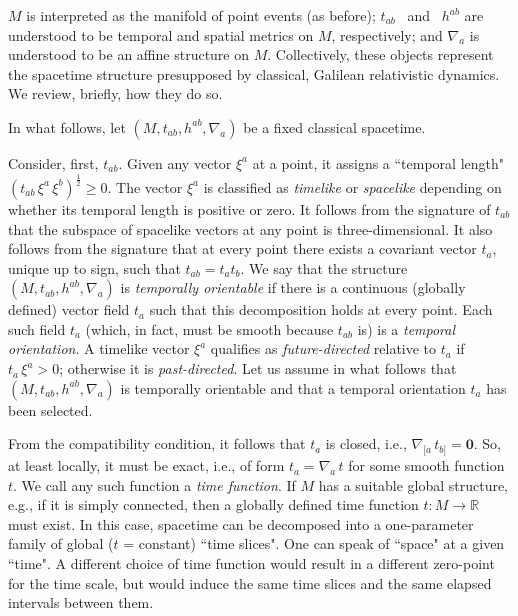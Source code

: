 \documentclass [12] {article}
\theoremstyle{plain}
\numberwithin{figure}{subsection}
\numberwithin{proposition}{subsection}
\begin{document}
 $M$ is interpreted as the manifold of point events (as before);   $t_{ab}$  \, and  \,  $h^{ab}$ are understood to be temporal and spatial metrics on $M$, respectively; and  $\nabla_a$  is understood to be an affine structure on $M$. Collectively, these objects represent the spacetime structure presupposed by classical, Galilean relativistic dynamics. We review, briefly,  how they do so.

In what follows, let $(M, t_{ab}, h^{ab}, \nabla_a)$ be a fixed classical spacetime.

Consider, first, $t_{ab}$.  Given any vector $\xi^a$ at a point,  it assigns a ``temporal length" $(t_{ab} \,  \xi^a  \, \xi^b)^{\frac{1}{2}}  \geq  0$.  The vector $\xi^a$ is classified as \emph{timelike} or \emph{ spacelike} depending on whether its temporal length is positive or zero.  It follows from the signature of $t_{ab}$ that the subspace of spacelike vectors at any point is three-dimensional. It also follows from the signature that at every point there exists a covariant vector $t_a$, unique up to sign, such that  $t_{ab} = t_a  t_b$.  We say that the structure  $(M, t_{ab}, h^{ab}, \nabla_a)$  is \emph{temporally orientable} if there is a continuous (globally defined) vector field $t_a$ such that this decomposition holds at every point.  Each such field $t_a$ (which, in fact, must be smooth because $t_{ab}$ is) is a \emph{temporal orientation}.  A timelike vector $\xi^a$ qualifies as \emph{future-directed}  relative to $t_a$ if  $ t_a \, \xi^a  > 0$; otherwise it is \emph{past-directed}. %
Let us assume in what follows that  $(M, t_{ab}, h^{ab}, \nabla_a)$ is temporally orientable and that a temporal orientation $t_a$ has been selected.

From the compatibility condition, it follows that $t_a$ is closed, i.e., $\nabla_{[a} \, t_{b]} = \mathbf{0}$.  So, at least locally, it must be exact, i.e., of form $t_a = \nabla_a \, t$ for some smooth function $t$. We call any such function a  \emph{time function}.  If $M$ has a suitable global structure, e.g., if it is simply connected, then a globally  defined time function  $t:M\rightarrow \mathbb{R}$ \,  must exist.  In this case, spacetime can be decomposed into a one-parameter family of global ($t$ = constant) ``time slices". One can speak of ``space" at a given ``time". A different choice of time function would result in a different zero-point for the time scale, but would induce the same time slices and the same elapsed intervals between them. 
\end{document}

